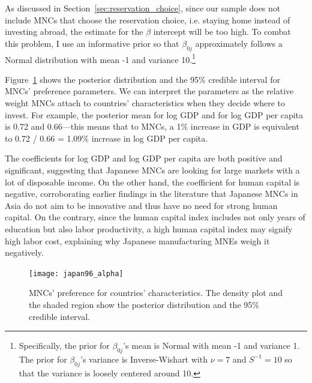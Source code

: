 As discussed in Section~\ref{sec:reservation_choice}, since our sample does not include MNCs that choose the reservation choice, i.e. staying home instead of
investing abroad, the estimate for the $\beta$ intercept will be too high. To
combat this problem, I use an informative prior so that $\beta_{0j}$
approximately follows a Normal distribution with mean -1 and variance
10.\footnote{Specifically, the prior for $\beta_{0j}$'s mean is Normal with mean
  -1 and variance 1. The prior for $\beta_{0j}$'s variance is
  Inverse-Wishart with $\nu = 7$ and $S^{-1} = 10$ so that the variance is
  loosely centered around 10.}

Figure~\ref{fig:japan96_alpha} shows the posterior distribution and the 95\%
credible interval for MNCs' preference parameters. We can interpret the
parameters as the relative weight MNCs attach to countries' characteristics when
they decide where to invest. For example, the posterior mean for log GDP and for
log GDP per capita is 0.72 and 0.66---this means that to MNCs, a 1\% increase
in GDP is equivalent to 0.72 / 0.66 = 1.09\% increase in log GDP per capita.

The coefficients for log GDP and log GDP per capita are both positive and
significant, suggesting that Japanese MNCs are looking for large markets with a
lot of disposable income. On the other hand, the coefficient for human capital
is negative, corroborating earlier findings in the literature that Japanese MNCs
in Asia do not aim to be innovative and thus have no need for strong human
capital. On the contrary, since the human capital index includes not only years of
education but also labor productivity, a high human capital index may signify
high labor cost, explaining why Japanese manufacturing MNEs weigh it negatively. 

\begin{figure}[tbp] \centering
  \texttt{[image: japan96\_alpha]}
  \caption[MNCs' preference for countries' characteristics.]{MNCs' preference for countries' characteristics. The density plot and the shaded region show the posterior distribution and the 95\% credible interval.}
  \label{fig:japan96_alpha}
\end{figure}

